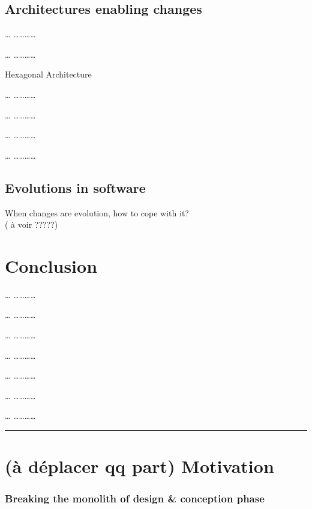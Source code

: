 \subsection{Architectures enabling
changes}\label{architectures-enabling-changes}

\ldots{} \ldots{}\ldots{}\ldots{}\ldots{}

\ldots{} \ldots{}\ldots{}\ldots{}\ldots{}

Hexagonal Architecture

\ldots{} \ldots{}\ldots{}\ldots{}\ldots{}

\ldots{} \ldots{}\ldots{}\ldots{}\ldots{}

\ldots{} \ldots{}\ldots{}\ldots{}\ldots{}

\ldots{} \ldots{}\ldots{}\ldots{}\ldots{}

\subsection{Evolutions in software}\label{evolutions-in-software}

When changes are evolution, how to cope with it?\\( à voir ?????)

\section{Conclusion}\label{conclusion}

\ldots{} \ldots{}\ldots{}\ldots{}\ldots{}

\ldots{} \ldots{}\ldots{}\ldots{}\ldots{}

\ldots{} \ldots{}\ldots{}\ldots{}\ldots{}

\ldots{} \ldots{}\ldots{}\ldots{}\ldots{}

\ldots{} \ldots{}\ldots{}\ldots{}\ldots{}

\ldots{} \ldots{}\ldots{}\ldots{}\ldots{}

\ldots{} \ldots{}\ldots{}\ldots{}\ldots{}

\begin{center}\rule{3in}{0.4pt}\end{center}

\section{(à déplacer qq part)
Motivation}\label{a-deplacer-qq-part-motivation}

\subsubsection{Breaking the monolith of design \& conception
phase}\label{breaking-the-monolith-of-design-conception-phase}

